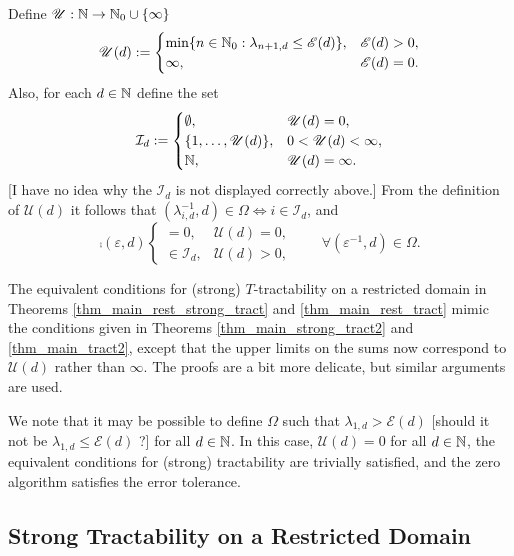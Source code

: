 \documentclass[sort&compress]{elsarticle}
\newcommand{\theM}{\mathscr{E}}
\newcommand{\theUB}{\mathscr{U}}
\renewcommand{\hI}{\mathcal{I}}
\newcommand{\peter}[1]{\begingroup\color{violet}#1\endgroup}
\begin{document}
Define $\theUB: \naturals \to \natzero \cup \{\infty\}$
\begin{equation} \label{eq:Mddef}
    \theUB(d) := \begin{cases}
        \min\{n \in \natzero : \lambda_{n+1,d} \le \theM(d)\}, & \theM(d) > 0, \\
        \infty, & \theM(d) = 0.
    \end{cases}
\end{equation}
Also, for each $d \in \mathbb{N}$ define the \peter{set}
\begin{equation} \label{eq:hIdef}
\mathcal{I}_d :=\begin{cases} 
\emptyset, & \theUB(d) = 0, \\
\{1,\ldots, \theUB(d)\}, & 0 < \theUB(d) < \infty, \\
\naturals, & \theUB(d) = \infty.
\end{cases}
\end{equation}
\peter{[I have no idea why the $\mathcal{I}_d$ is not displayed correctly above.]}
From the definition of $\theUB(d)$ it follows that $(\lambda_{i,d}^{-1},d) \in \Omega  \iff i \in \hI_d$, and
\begin{equation} \label{eq:comprestr}
  \comp(\varepsilon,d) \begin{cases}
= 0, & \theUB(d) = 0, \\
    \in \hI_d, & \theUB(d) > 0, 
\end{cases}
\qquad \forall (\varepsilon^{-1},d) \in \Omega.
\end{equation}


The equivalent conditions for (strong) $T$-tractability on a restricted domain in Theorems \ref{thm_main_rest_strong_tract} and \ref{thm_main_rest_tract} mimic the conditions given in Theorems \ref{thm_main_strong_tract2} and \ref{thm_main_tract2}, except that the upper limits on the sums now correspond to $\theUB(d)$ rather than $\infty$.  The proofs are a bit more delicate, but similar arguments are used.  

We note that it may be possible to define $\Omega$ such that $\lambda_{1,d} > \theM(d)$ 
\peter{[should it not be $\lambda_{1,d} \le \theM(d)$ ?]}
for all $d \in \mathbb{N}$. In this case, $\theUB(d) = 0$ for all $d \in \mathbb{N}$, the equivalent conditions for (strong) tractability are trivially satisfied, and the zero algorithm satisfies the error tolerance.

\subsection{Strong Tractability on a Restricted Domain}
\end{document}

